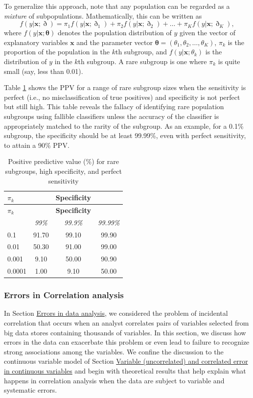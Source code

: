 \documentclass[]{krantz}
\begin{document}
To generalize this approach, note that any population can be regarded as
a \emph{mixture} of subpopulations. Mathematically, this can be written
as \[\label{eq:10-1.5}
f(y\vert \mathbf{x};{\boldsymbol \eth}) = \pi_1 f(y\vert
\mathbf{x};\eth_1 ) + \pi_2 f(y\vert \mathbf{x};\eth_2 ) +
\ldots + \pi_K f(y\vert \mathbf{x};\eth_K ),\] where
\(f(y\vert \mathbf{x}; {\boldsymbol \theta})\) denotes the population
distribution of \(y\) given the vector of explanatory variables
\(\mathbf{x}\) and the parameter vector
\({\boldsymbol \theta } = (\theta_1 ,\theta_2, \ldots, \theta_K )\),
\(\pi _k\) is the proportion of the population in the \(k\)th subgroup,
and \(f(y\vert \mathbf{x};\theta_k)\) is the distribution of \(y\) in
the \(k\)th subgroup. A rare subgroup is one where \(\pi_k\) is quite
small (say, less than 0.01).

Table \ref{tab:table10-1} shows the PPV for a range of rare subgroup
sizes when the sensitivity is perfect (i.e., no misclassification of
true positives) and specificity is not perfect but still high. This
table reveals the fallacy of identifying rare population subgroups using
fallible classifiers unless the accuracy of the classifier is
appropriately matched to the rarity of the subgroup. As an example, for
a 0.1\% subgroup, the specificity should be at least 99.99\%, even with
perfect sensitivity, to attain a 90\% PPV.

\begin{longtable}[]{@{}lccc@{}}
\caption{\label{tab:table10-1} Positive predictive value (\%) for rare
subgroups, high specificity, and perfect sensitivity}\tabularnewline
\toprule
\textbf{\(\pi_k\)} & & \textbf{Specificity} &\tabularnewline
\midrule
\endfirsthead
\toprule
\textbf{\(\pi_k\)} & & \textbf{Specificity} &\tabularnewline
\midrule
\endhead
& \emph{99\%} & \emph{99.9\%} & \emph{99.99\%}\tabularnewline
0.1 & 91.70 & 99.10 & 99.90\tabularnewline
0.01 & 50.30 & 91.00 & 99.00\tabularnewline
0.001 & 9.10 & 50.00 & 90.90\tabularnewline
0.0001 & 1.00 & 9.10 & 50.00\tabularnewline
\bottomrule
\end{longtable}

\hypertarget{sec:10-4.2.4}{\subsubsection{Errors in Correlation
analysis}\label{sec:10-4.2.4}}

In Section \protect\hyperlink{sec:10-4}{Errors in data analysis}, we
considered the problem of incidental correlation that occurs when an
analyst correlates pairs of variables selected from big data stores
containing thousands of variables. In this section, we discuss how
errors in the data can exacerbate this problem or even lead to failure
to recognize strong associations among the variables. We confine the
discussion to the continuous variable model of Section
\protect\hyperlink{sec:10-4.2.1}{Variable (uncorrelated) and correlated
error in continuous variables} and begin with theoretical results that
help explain what happens in correlation analysis when the data are
subject to variable and systematic errors.
\end{document}
